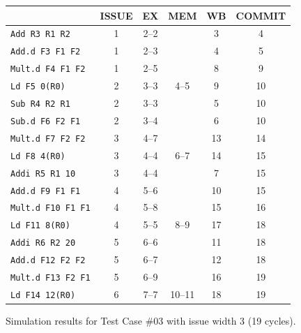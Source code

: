 \documentclass[11pt]{article}
\renewcommand{\_}{\origunderscore\allowbreak}
\begin{document}
\begin{figure}[H]
\centering
\small
\begin{tabular}{lccccc}
\hline
 & ISSUE & EX & MEM & WB & COMMIT \\
\hline
\texttt{Add R3 R1 R2} & 1 & 2--2 &  & 3 & 4 \\
\texttt{Add.d F3 F1 F2} & 1 & 2--3 &  & 4 & 5 \\
\texttt{Mult.d F4 F1 F2} & 1 & 2--5 &  & 8 & 9 \\
\texttt{Ld F5 0(R0)} & 2 & 3--3 & 4--5 & 9 & 10 \\
\texttt{Sub R4 R2 R1} & 2 & 3--3 &  & 5 & 10 \\
\texttt{Sub.d F6 F2 F1} & 2 & 3--4 &  & 6 & 10 \\
\texttt{Mult.d F7 F2 F2} & 3 & 4--7 &  & 13 & 14 \\
\texttt{Ld F8 4(R0)} & 3 & 4--4 & 6--7 & 14 & 15 \\
\texttt{Addi R5 R1 10} & 3 & 4--4 &  & 7 & 15 \\
\texttt{Add.d F9 F1 F1} & 4 & 5--6 &  & 10 & 15 \\
\texttt{Mult.d F10 F1 F1} & 4 & 5--8 &  & 15 & 16 \\
\texttt{Ld F11 8(R0)} & 4 & 5--5 & 8--9 & 17 & 18 \\
\texttt{Addi R6 R2 20} & 5 & 6--6 &  & 11 & 18 \\
\texttt{Add.d F12 F2 F2} & 5 & 6--7 &  & 12 & 18 \\
\texttt{Mult.d F13 F2 F1} & 5 & 6--9 &  & 16 & 19 \\
\texttt{Ld F14 12(R0)} & 6 & 7--7 & 10--11 & 18 & 19 \\
\hline
\end{tabular}
\caption{Simulation results for Test Case \#03 with issue width 3 (19 cycles).}
\end{figure}
\end{document}
